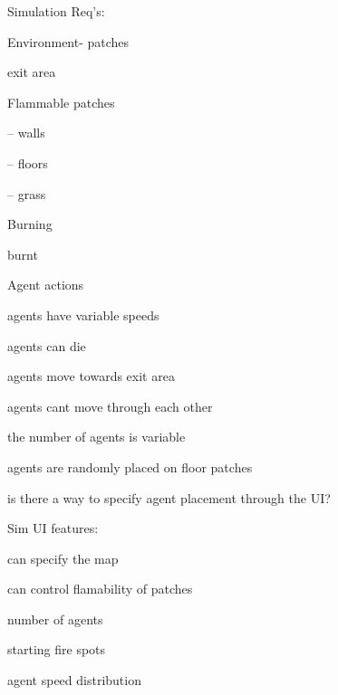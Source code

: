 \documentclass[12pt,letterpaper]{article}
\begin{document}
Simulation Req's:

Environment- patches

    exit area

    Flammable patches

-- walls

-- floors

-- grass

    Burning

    burnt

Agent actions

    agents have variable speeds

    agents can die

    agents move towards exit area

    agents cant move through each other

    the number of agents is variable

    agents are randomly placed on floor patches

    is there a way to specify agent placement through the UI?

Sim UI features:

    can specify the map

    can control flamability of patches

    number of agents

    starting fire spots

    agent speed distribution


\end{document}
